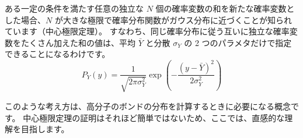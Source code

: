\documentclass[uplatex,dvipdfmx,a4paper,11pt]{jsarticle}
\begin{document}
\begin{boxnote}

ある一定の条件を満たす任意の独立な $N$ 個の確率変数の和を新たな確率変数とした場合、$N$ が大きな極限で確率分布関数がガウス分布に近づくことが知られています（中心極限定理）。
すなわち、同じ確率分布に従う互いに独立な確率変数をたくさん加えた和の値は、平均 $\bar{Y}$ と分散 $\sigma_Y$ の 2 つのパラメタだけで指定できることになるわけです。
\begin{equation*}
P_Y(y) = \dfrac{1}{\sqrt{2 \pi \sigma_Y^2}} \exp \left(-\dfrac{(y-\bar{Y})^2}{2 \sigma_Y^2} \right)
\end{equation*}

このような考え方は、高分子のボンドの分布を計算するときに必要になる概念です。
中心極限定理の証明はそれほど簡単ではないため、ここでは、直感的な理解を目指します。

\end{boxnote}

\color{black}

\vspace{8pt}
\end{document}
